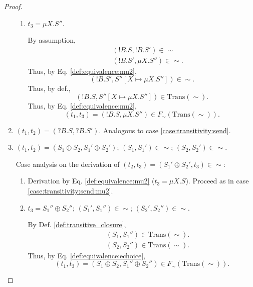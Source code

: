 \documentclass{llncs}
\newcommand*{\Trans}{\mathrm{Trans}}
\newcommand*{\sequiv}{\sim}
\newcommand*{\send}{\mathord{!}}
\newcommand*{\recv}{\mathord{?}}
\newcommand*{\echoice}{\oplus}
\renewcommand*{\|}{\;|\;}
\begin{document}
\begin{proof}
\begin{enumerate}
\begin{enumerate}
        \item
          \label{case:transitivity:send:mu2}
           $t_3 = \mu X.S''$.

          By assumption,
          \begin{eqnarray*}
            && (\send B.S, \send B.S') \in \sequiv \\
            && (\send B.S', \mu X.S'') \in \sequiv.
          \end{eqnarray*}
          Thus, by Eq. \ref{def:equivalence:mu2},
          \begin{equation*}
            (\send B.S', S''[X \mapsto \mu X.S'']) \in \sequiv.
          \end{equation*}
          Thus, by def.,
          \begin{equation*}
            (\send B.S, S''[X \mapsto \mu X.S'']) \in \Trans(\sequiv).
          \end{equation*}
          Thus, by Eq. \ref{def:equivalence:mu2},
          \begin{equation*}
            (t_1, t_3) = (\send B.S, \mu X.S'') \in F_\sequiv(\Trans(\sequiv)).
          \end{equation*}
      \end{enumerate}

    \item
      \label{case:transitivity:recv}
      $(t_1, t_2) = (\recv B.S, \recv B.S')$. Analogous to case
      \ref{case:transitivity:send}.

    \item
      \label{case:transitivity:echoice}
      $(t_1, t_2) = (S_1 \echoice S_2, S_1' \echoice S_2')$;
      $(S_1, S_1') \in \sequiv$;
      $(S_2, S_2') \in \sequiv$.

      Case analysis on the derivation of
      $(t_2, t_3) = (S_1' \echoice S_2', t_3) \in \sequiv$:
      \begin{enumerate}
        \item Derivation by Eq. \ref{def:equivalence:mu2} ($t_3 = \mu X.S$).
          Proceed as in case \ref{case:transitivity:send:mu2}.

        \item $t_3 = S_1'' \echoice S_2''$; $(S_1', S_1'') \in \sequiv$;
          $(S_2', S_2'') \in \sequiv$.

          By Def. \ref{def:transitive_closure},
          \begin{eqnarray*}
            && (S_1, S_1'') \in \Trans(\sequiv). \\
            && (S_2, S_2'') \in \Trans(\sequiv).
          \end{eqnarray*}
          Thus, by Eq. \ref{def:equivalence:echoice},
          \begin{equation*}
            (t_1, t_3) = (S_1 \echoice S_2, S_1'' \echoice S_2'') \in F_\sequiv(\Trans(\sequiv)).
          \end{equation*}
      \end{enumerate}


\end{enumerate}
\end{proof}
\end{document}
